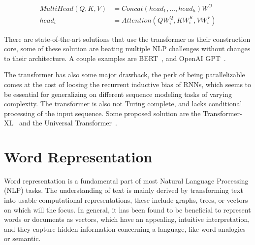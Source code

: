 \begin{equation}
    \begin{split}
        MultiHead(Q, K, V) & = Concat\left(head_{1}, \ldots,  head_{h}\right) W^{O} \\
        head_{i} & = Attention \left(Q W_{i}^{Q}, K W_{i}^{K}, V W_{i}^{V}\right)
    \end{split}
    \label{eq:multi_attention}
\end{equation}

There are state-of-the-art solutions that use the transformer as their construction core, some of these solution are beating multiple NLP challenges without changes to their architecture. A couple examples are BERT~\citep{devlin2018bert}, and OpenAI GPT~\citep{radford2018improving, radford2019language}. 

The transformer has also some major drawback, the perk of being parallelizable comes at the cost of loosing the recurrent inductive bias of RNNs, which seems to be essential for generalizing on different sequence modeling tasks of varying complexity. The transformer is also not Turing complete, and lacks conditional processing of the input sequence. Some proposed solution are the Transformer-XL~\citep{dai2019transformerxl} and the Universal Transformer~\citep{dehghani2018universal}. 

\section{Word Representation}
\label{sec:word_embedding}
\paragraph{}
Word representation is a fundamental part of most Natural Language Processing (NLP) tasks. The understanding of text is mainly derived by transforming text into usable computational representations, these include graphs, trees, or vectors on which will the focus.   In general, it has been found to be beneficial to represent words or documents as vectors, which have an appealing, intuitive interpretation, and they capture hidden information concerning a language, like word analogies or semantic. 


